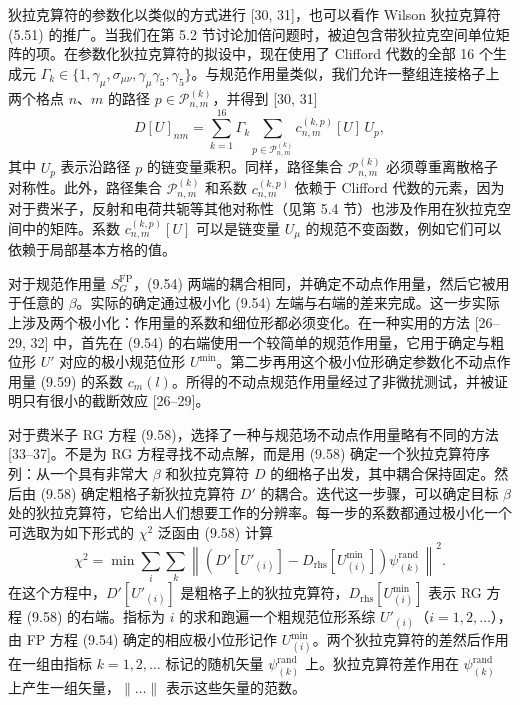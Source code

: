 狄拉克算符的参数化以类似的方式进行 [30, 31]，也可以看作 Wilson 狄拉克算符 (5.51) 的推广。当我们在第 5.2 节讨论加倍问题时，被迫包含带狄拉克空间单位矩阵的项。在参数化狄拉克算符的拟设中，现在使用了 Clifford 代数的全部 16 个生成元 $\Gamma_k \in \{1, \gamma_\mu, \sigma_{\mu\nu}, \gamma_\mu\gamma_5, \gamma_5\}$。与规范作用量类似，我们允许一整组连接格子上两个格点 $n$、$m$ 的路径 $p \in \mathcal{P}^{(k)}_{n,m}$，并得到 [30, 31]
\begin{equation}
  D[U]_{nm} = \sum_{k=1}^{16}\Gamma_k
    \sum_{p\in\mathcal{P}^{(k)}_{n,m}}c^{(k,p)}_{n,m}[U]\,U_p ,
\end{equation}
其中 $U_p$ 表示沿路径 $p$ 的链变量乘积。同样，路径集合 $\mathcal{P}^{(k)}_{n,m}$ 必须尊重离散格子对称性。此外，路径集合 $\mathcal{P}^{(k)}_{n,m}$ 和系数 $c^{(k,p)}_{n,m}$ 依赖于 Clifford 代数的元素，因为对于费米子，反射和电荷共轭等其他对称性（见第 5.4 节）也涉及作用在狄拉克空间中的矩阵。系数 $c^{(k,p)}_{n,m}[U]$ 可以是链变量 $U_\mu$ 的规范不变函数，例如它们可以依赖于局部基本方格的值。

对于规范作用量 $S^{\mathrm{FP}}_G$，(9.54) 两端的耦合相同，并确定不动点作用量，然后它被用于任意的 $\beta$。实际的确定通过极小化 (9.54) 左端与右端的差来完成。这一步实际上涉及两个极小化：作用量的系数和细位形都必须变化。在一种实用的方法 [26--29, 32] 中，首先在 (9.54) 的右端使用一个较简单的规范作用量，它用于确定与粗位形 $U'$ 对应的极小规范位形 $U^{\min}$。第二步再用这个极小位形确定参数化不动点作用量 (9.59) 的系数 $c_m(l)$。所得的不动点规范作用量经过了非微扰测试，并被证明只有很小的截断效应 [26--29]。

对于费米子 RG 方程 (9.58)，选择了一种与规范场不动点作用量略有不同的方法 [33--37]。不是为 RG 方程寻找不动点解，而是用 (9.58) 确定一个狄拉克算符序列：从一个具有非常大 $\beta$ 和狄拉克算符 $D$ 的细格子出发，其中耦合保持固定。然后由 (9.58) 确定粗格子新狄拉克算符 $D'$ 的耦合。迭代这一步骤，可以确定目标 $\beta$ 处的狄拉克算符，它给出人们想要工作的分辨率。每一步的系数都通过极小化一个可选取为如下形式的 $\chi^2$ 泛函由 (9.58) 计算
\begin{equation}
  \chi^2 = \min\sum_i\sum_k
    \left\|\left(D'[U'_{(i)}] - D_{\mathrm{rhs}}[U^{\min}_{(i)}]\right)
      \psi^{\mathrm{rand}}_{(k)}\right\|^2 .
\end{equation}
在这个方程中，$D'[U'_{(i)}]$ 是粗格子上的狄拉克算符，$D_{\mathrm{rhs}}[U^{\min}_{(i)}]$ 表示 RG 方程 (9.58) 的右端。指标为 $i$ 的求和跑遍一个粗规范位形系综 $U'_{(i)}$（$i = 1, 2, \ldots$），由 FP 方程 (9.54) 确定的相应极小位形记作 $U^{\min}_{(i)}$。两个狄拉克算符的差然后作用在一组由指标 $k = 1, 2, \ldots$ 标记的随机矢量 $\psi^{\mathrm{rand}}_{(k)}$ 上。狄拉克算符差作用在 $\psi^{\mathrm{rand}}_{(k)}$ 上产生一组矢量，$\|\ldots\|$ 表示这些矢量的范数。

